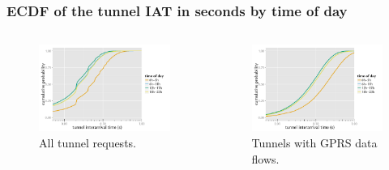\documentclass{beamer}
\begin{document}
\begin{frame}
	\frametitle{ECDF of the tunnel IAT in seconds by time of day}
	\begin{columns}
		\begin{figure}
			\includegraphics[width=0.7\columnwidth]{../../chapters/04-mobilenets/images/R-IAT-successful-2h-ecdfs.pdf}
			\vspace{-4mm}
			\caption{All tunnel requests.}
		\end{figure}
		\vspace{-10mm}
		\begin{figure}
			\includegraphics[width=0.7\columnwidth]{../../chapters/04-mobilenets/images/R-IAT-fromflows-gprs-ecdfs-2h.pdf}
			\vspace{-4mm}
			\caption{Tunnels with GPRS data flows.}
		\end{figure}


\end{columns}
\end{frame}
\end{document}
